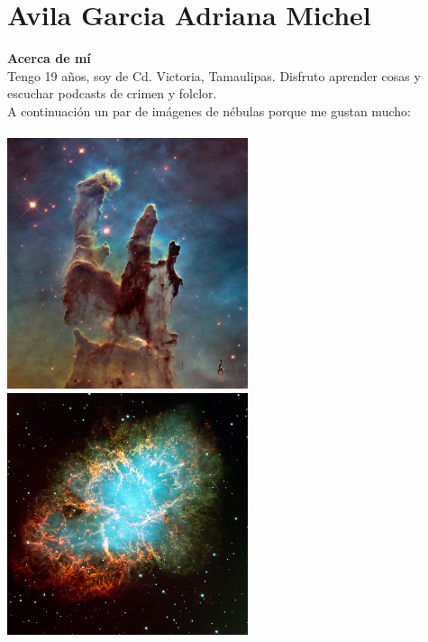 \chapter{Avila Garcia Adriana Michel}
\textbf{Acerca de mí}\\
Tengo 19 años, soy de Cd. Victoria, Tamaulipas. Disfruto aprender cosas y escuchar podcasts de crimen y folclor.\\
A continuación un par de imágenes de nébulas porque me gustan mucho:\\
\\
\includegraphics[width=200pt]{419001986/nebula.jpg}
\includegraphics[width=200pt]{419001986/crab.jpg}
